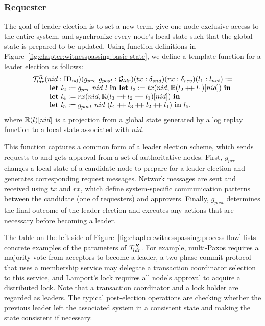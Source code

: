 \subsubsection{Requester}
The goal of leader election is to set a new term, give one node exclusive access to 
the entire system, and synchronize every node's local state such that the
global state is prepared to be updated.
Using function definitions in Figure~\ref{fig:chapter:witnesspassing:basic-state}, we define a template function for a leader election as follows:
$$
\begin{array}{l}
	\ldrfunction (nid: \nodeid) (g_{pre}\ g_{post}:  \gldrfunction)
	(tx: \sendfunction)(rx: \recvfunction)(l_1  :\networklog ) := \\
\ \ \ \ \ \ \ \mbox{\textbf{let}} \ l_2 := g_{pre}\ nid \ l  \ \mbox{\textbf{in}}\ \mbox{\textbf{let}}\ l_3 := tx(nid, \replay(l_2 \mdoubleplus l_1)[nid]) \ \mbox{\textbf{in}}  \\
\ \ \ \ \ \ \ \mbox{\textbf{let}} \ l_4 := rx(nid, \replay(l_3 \mdoubleplus l_2 \mdoubleplus l_1)[nid]) \
  \mbox{\textbf{in}}\\ 
\ \ \ \ \ \ \ \mbox{\textbf{let}} \ l_5 := g_{post}\ nid \ (l_4 \mdoubleplus l_3 \mdoubleplus l_2 \mdoubleplus l_1) \ \mbox{\textbf{in}} \ l_5. \\
\end{array}
$$
where $\mathbb{R}(l)[nid]$ is a projection from a global state generated by a log replay function to 
a local state associated with $nid$.

This function captures a common form of a leader election scheme, which sends requests to
and gets approval from a set of authoritative nodes.
First, $g_{pre}$ changes a local state of a candidate node to prepare
for a leader election and generates corresponding request messages.
Network messages are sent and received using $tx$ and $rx$, which define system-specific
communication patterns between the candidate (one of requesters) and approvers.
Finally, $g_{post}$ determines the final outcome of the 
leader election and executes any actions that are necessary before becoming a leader.

The table on the left side of Figure~\ref{fig:chapter:witnesspassing:process-flow} lists concrete examples of the parameters of
$\mathcal{T}^{R}_{ldr}$. For example, multi-Paxos requires a majority vote from acceptors to
become a leader, a two-phase commit protocol that uses a membership service may delegate
a transaction coordinator selection to this service, and Lamport's lock requires all node's
approval to acquire a distributed lock. Note that a transaction coordinator and a lock holder are
regarded as leaders. The typical post-election operations are checking whether the
previous leader left the associated system in a consistent state and making the state consistent
if necessary. 

